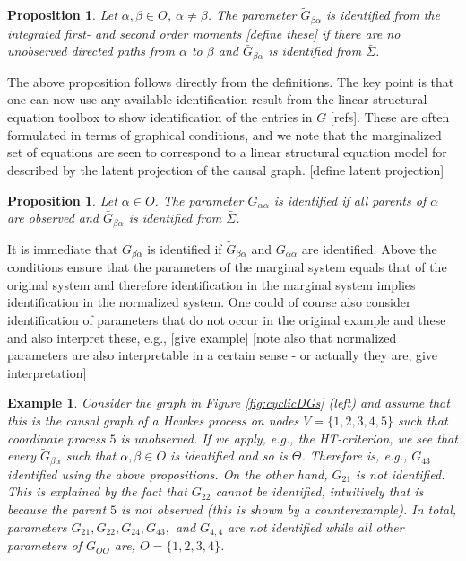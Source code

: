 \documentclass[accepted]{uai2021} %
\newtheorem{exmp}[thm]{Example}
\newtheorem{prop}[thm]{Proposition}
\begin{document}
\begin{prop}
	Let $\alpha,\beta \in O$, $\alpha\neq \beta$. The parameter 
	$\tilde{G}_{\beta\alpha}$ is 
	identified 
	from the integrated first- and second order moments [define these] if there 
	are no unobserved directed paths from 
	$\alpha$ to $\beta$ and $\bar{G}_{\beta\alpha}$ is identified from 
	$\bar{\Sigma}$.
\end{prop}

The above proposition follows directly from the definitions. The key point is 
that one can now use any available identification result from the linear 
structural equation toolbox to show identification of the entries in 
$\tilde{G}$ [refs]. These are often formulated in terms of graphical 
conditions, and we note that the 
marginalized set of equations are seen to correspond to a linear structural 
equation model for described by the latent projection of the causal graph. 
[define latent projection]

\begin{prop}
	Let $\alpha\in O$. The parameter $G_{\alpha\alpha}$ is identified if all 
	parents of $\alpha$ are observed and $\bar{G}_{\beta\alpha}$ is identified 
	from 
	$\bar{\Sigma}$.
\end{prop}

It is immediate that $G_{\beta\alpha}$ is identified if 
$\tilde{G}_{\beta\alpha}$ and $G_{\alpha\alpha}$ are identified. Above the 
conditions ensure that the parameters of the marginal system equals that of the 
original system and therefore identification in the marginal system implies 
identification in the normalized system. One could of course also consider 
identification of parameters that do not occur in the original example and 
these and also interpret these, e.g., [give example] [note also that normalized 
parameters are also interpretable in a certain sense - or actually they are, 
give interpretation]

\begin{exmp}
	Consider the graph in Figure \ref{fig:cyclicDGs} (left) and assume that 
	this is the causal graph of a Hawkes process on nodes $V = \{1,2,3,4,5\}$ 
	such that coordinate process $5$ is unobserved. If we apply, e.g., the 
	HT-criterion, we see that every $\tilde{G}_{\beta\alpha}$ such that 
	$\alpha,\beta\in O$ is identified and so is $\Theta$. Therefore is, e.g., 
	$G_{43}$ identified using the above propositions. On the other hand, 
	$G_{21}$ is not identified. This is explained by the fact that $G_{22}$ 
	cannot 
	be identified, 
	intuitively that is because the parent $5$ is not observed (this is shown 
	by a counterexample). In total, parameters $G_{21}, G_{22}, G_{24}, 
	G_{43},$ and $G_{4,4}$ are not identified while all other parameters of 
	$G_{OO}$ are, $O= \{1,2,3,4\}$. 
\end{exmp}
\end{document}
